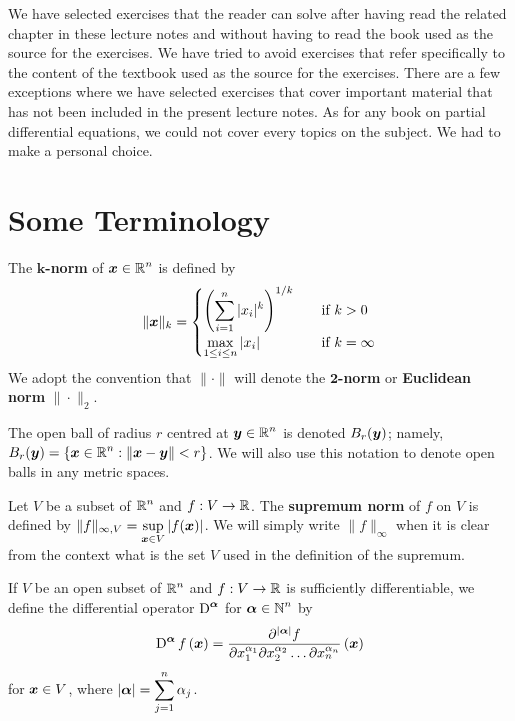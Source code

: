 We have selected exercises that the reader can solve after having read
the related chapter in these lecture notes and without having to read
the book used as the source for the exercises.  We have tried to avoid
exercises that refer specifically to the content of the textbook used
as the source for the exercises.  There are a few exceptions where
we have selected exercises that cover important material that has not
been included in the present lecture notes.  As for any book on partial
differential equations, we could not cover every topics on the
subject.  We had to make a personal choice.

\section*{Some Terminology}

The {\bfseries $\mathbf{k}$-norm} of
$\displaystyle {\bm{x}} \in \mathbb{R}^n$ is defined by
\[
\|{\bm{x}}\|_k =
\begin{cases}
\displaystyle \left(\sum_{i=1}^n |x_i|^k\right)^{1/k} & \quad \text{if}\ k > 0 \\
\displaystyle \max_{1\leq i \leq n} |x_i| & \quad \text{if} \ k = \infty  
\end{cases}
\]
We adopt the convention that $\|\cdot\|$ will denote the
{\bfseries $\mathbf{2}$-norm} or
{\bfseries Euclidean norm} $\|\cdot\|_2$.

The open ball of radius $r$ centred at $\displaystyle {\bm{y}} \in \mathbb{R}^n$
is denoted $\displaystyle B_r({\bm{y}})$; namely,\\
$\displaystyle B_r({\bm{y}}) = \left\{ {\bm{x}} \in \mathbb{R}^n :
\left\|{\bm{x}}-{\bm{y}} \right\| < r \right\}$.  We will also use this
notation to denote open balls in any metric spaces.

Let $V$ be a subset of $\displaystyle \mathbb{R}^n$ and $f:V \to \mathbb{R}$.  The
{\bfseries supremum norm}
of $f$ on $V$ is defined by
$\displaystyle \|f\|_{\infty,V} = \sup_{{\bm{x}}\in V} |f({\bm{x}})|$.
We will simply write $\|f\|_\infty$ when it is clear from the context
what is the set $V$ used in the definition of the supremum.

If $V$ be an open subset of $\displaystyle \mathbb{R}^n$ and $f:V \to \mathbb{R}$ is
sufficiently differentiable, we define the differential operator
$\displaystyle \operatorname{D}^{{\bm{\alpha}}}$ for $\displaystyle {\bm{\alpha}} \in \mathbb{N}^n$
by
\[
\operatorname{D}^{{\bm{\alpha}}} f\left({\bm{x}}\right)
= \frac{\partial^{|{\bm{\alpha}}|} f}{\partial x_1^{\alpha_1}
\partial x_2^{\alpha_2} \ldots \partial x_n^{\alpha_n}}\left({\bm{x}}\right)
\]
for ${\bm{x}} \in V$, where
$\displaystyle |{\bm{\alpha}}| = \sum_{j=1}^n \alpha_j$.

